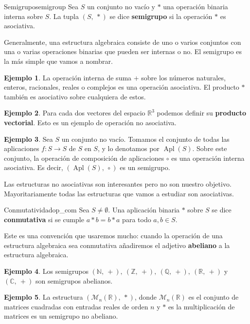 \documentclass[a4paper]{book}
\theoremstyle{definition}
\theoremstyle{ejemplo}
\newtheorem{ejem}{Ejemplo}[section]
\theoremstyle{demostracion}
\newcommand{\complejos}{\mathbb{C}}
\newcommand{\reales}{\mathbb{R}}
\newcommand{\racionales}{\mathbb{Q}}
\newcommand{\enteros}{\mathbb{Z}}
\newcommand{\naturales}{\mathbb{N}}
\DeclareMathOperator{\apl}{Apl}
\begin{document}
\begin{define}{Semigrupo}{semigroup}
	Sea $S$ un conjunto no vacío y $*$ una operación binaria interna sobre $S$. La tupla $(S,\ *)$ se dice \textbf{semigrupo} si la operación $*$ es asociativa.
\end{define}

Generalmente, una estructura algebraica consiste de uno o varios conjuntos con una o varias operaciones binarias que pueden ser internas o no. El semigrupo es la más simple que vamos a nombrar.

\begin{ejem}
	La operación interna de suma $+$ sobre los números naturales, enteros, racionales, reales o complejos es una operación asociativa. El producto $*$ también es asociativo sobre cualquiera de estos.
\end{ejem}
\begin{ejem}
	Para cada dos vectores del espacio $\reales^3$ podemos definir su \textbf{producto vectorial}. Esto es un ejemplo de operación no asociativa.
\end{ejem}
\begin{ejem}
	Sea $S$ un conjunto no vacío. Tomamos el conjunto de todas las aplicaciones $f: S \rightarrow S$ de $S$ en $S$, y lo denotamos por $\apl(S)$. Sobre este conjunto, la operación de composición de aplicaciones $\circ$ es una operación interna asociativa. Es decir, $(\apl(S),\ \circ)$ es un semigrupo.
\end{ejem}

Las estructuras no asociativas son interesantes pero no son nuestro objetivo. Mayoritariamente todas las estructuras que vamos a estudiar son asociativas.

\begin{define}{Conmutatividad}{op_com}
	Sea $S \neq \emptyset$. Una aplicación binaria $*$ sobre $S$ se dice \textbf{conmutativa} si se cumple $a*b = b*a$ para todo $a,b \in S$. 
\end{define}

Este es una convención que usaremos mucho: cuando la operación de una estructura algebraica sea conmutativa añadiremos el adjetivo \textbf{abeliano} a la estructura algebraica.

\begin{ejem}
	Los semigrupos $(\naturales,\ +),\ (\enteros,\ +),\ (\racionales,\ +),\ (\reales,\ +)$ y $(\complejos,\ +)$ son semigrupos abelianos.
\end{ejem}
\begin{ejem}
	La estructura $(\mathcal{M}_{n}(\reales),\ *)$, donde $\mathcal{M}_{n}(\reales)$ es el conjunto de matrices cuadradas con entradas reales de orden $n$ y $*$ es la multiplicación de matrices es un semigrupo no abeliano.
\end{ejem}
\end{document}
